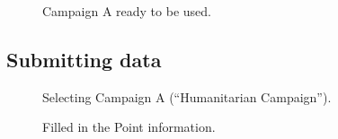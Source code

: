 \documentclass{article}
\begin{document}
		\begin{figure}[H]
			\centering
			\caption{Campaign A ready to be used.}
			\label{fig:eval-ca-4}
		\end{figure}

		\FloatBarrier

		\subsection{Submitting data}

		\begin{figure}[H]
			\centering
			\caption{Selecting Campaign A (``Humanitarian Campaign'').}
			\label{fig:eval-submita-1}
		\end{figure}

		\begin{figure}[H]
			\centering
			\caption{Filled in the Point information.}
			\label{fig:eval-submita-2}
		\end{figure}
\end{document}
